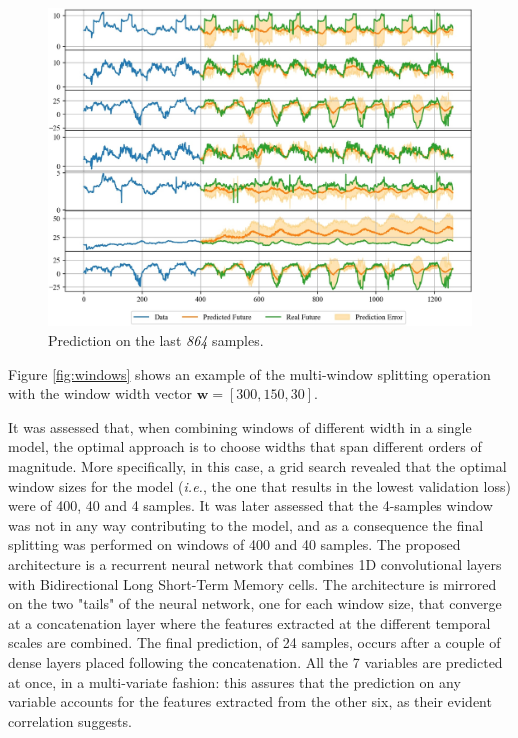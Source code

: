 \documentclass[conference]{IEEEtran}
\begin{document}
    \begin{figure}
        \includegraphics[width=\linewidth]{prediction.jpg}
        \caption{Prediction on the last \textit{864} samples.}
        \label{fig:prediction}
    \end{figure}
    
    Figure \ref{fig:windows} shows an example of the multi-window splitting operation with the window width vector $\textbf{w}=[300,150,30]$.
    
    It was assessed that, when combining windows of different width in a single model, the optimal approach is to choose widths that span different orders of magnitude. More specifically, in this case, a grid search revealed that the optimal window sizes for the model (\textit{i.e.}, the one that results in the lowest validation loss) were of 400, 40 and 4 samples. It was later assessed that the 4-samples window was not in any way contributing to the model, and as a consequence the final splitting was performed on windows of 400 and 40 samples.   
    The proposed architecture is a recurrent neural network that combines 1D convolutional layers with Bidirectional Long Short-Term Memory cells. The architecture is mirrored on the two "tails" of the neural network, one for each window size, that converge at a concatenation layer where the features extracted at the different temporal scales are combined. The final prediction, of 24 samples, occurs after a couple of dense layers placed following the concatenation. All the 7 variables are predicted at once, in a multi-variate fashion: this assures that the prediction on any variable accounts for the features extracted from the other six, as their evident correlation suggests.
    
\end{document}
